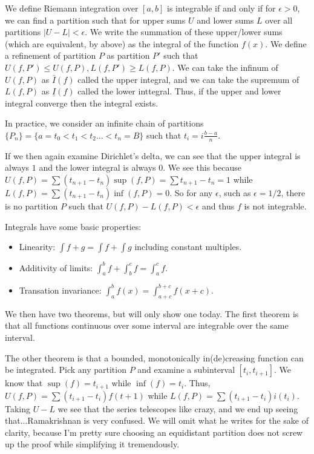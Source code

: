 \documentclass{report}
\begin{document}
We define Riemann integration over $[a,b]$ is integrable if and only if for $\epsilon > 0$, we can find a partition such that for upper sums $U$ and lower sums $L$ over all partitions $|U - L| < \epsilon$. We write the summation of these upper/lower sums (which are equivalent, by above) as the integral of the function $f(x)$. We define a refinement of partition $P$ as partition $P'$ such that $U(f,P') \leq U(f,P), L(f,P') \geq L(f,P)$. We can take the infinum of $U(f,P)$ as $\bar{I}(f)$ called the upper integral, and we can take the supremum of $L(f,P)$ as $\underline{I}(f)$ called the lower inttegral. Thus, if the upper and lower integral converge then the integral exists.

In practice, we consider an infinite chain of partitions $\{P_n\} = \{a = t_0 < t_1 < t_2...< t_n = B\}$ such that $t_i = i\frac{b-a}{n}$. 

If we then again examine Dirichlet's delta, we can see that the upper integral is always $1$ and the lower integral is always $0$. We see this because $U(f,P) = \sum{(t_{n+1} - t_n)\sup(f,P)} = \sum{t_{n+1} - t_n} = 1$ while $L(f,P) = \sum{(t_{n+1} - t_n)\inf(f,P)} = 0$. So for any $\epsilon$, such as $\epsilon = 1/2$, there is no partition $P$ such that $U(f,P) - L(f,P) < \epsilon$ and thus $f$ is not integrable.

Integrals have some basic properties:

\begin{itemize}
\item Linearity: $\int{f + g} = \int{f} + \int{g}$ including constant multiples.
\item Additivity of limits: $\int_a^b{f} + \int_b^c{f} = \int_a^c{f}$.
\item Transation invariance: $\int_a^b{f(x)} = \int_{a+c}^{b+c}{f(x+c)}$.
\end{itemize}

We then have two theorems, but will only show one today. The first theorem is that all functions continuous over some interval are integrable over the same interval.

The other theorem is that a bounded, monotonically in(de)creasing function can be integrated. Pick any partition $P$ and examine a subinterval $[t_i,t_{i+1}]$. We know that $\sup(f) = t_{i+1}$ while $\inf(f) = t_i$. Thus, $U(f,P) = \sum{(t_{i+1} - t_i)f(t+1)}$ while $L(f,P) = \sum{(t_{i+1} - t_i)i(t_i)}$. Taking $U - L$ we see that the series telescopes like crazy, and we end up seeing that...Ramakrishnan is very confused. We will omit what he writes for the sake of clarity, because I'm pretty sure choosing an equidistant partition does not screw up the proof while simplifying it tremendously. 
\end{document}
